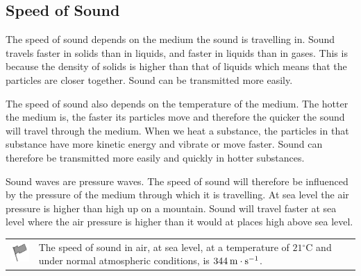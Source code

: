             \subsection{ Speed of Sound}
            \nopagebreak
      \label{m38799*id183885}The speed of sound depends on the medium the sound is travelling in. Sound travels faster in solids than in liquids, and faster in liquids than in gases. This is because the density of solids is higher than that of liquids which means that the particles are closer together. Sound can be transmitted more easily.\par 
      \label{m38799*id183891}The speed of sound also depends on the temperature of the medium. The hotter the medium is, the faster its particles move and therefore the quicker the sound will travel through the medium. When we heat a substance, the particles in that substance have more kinetic energy and vibrate or move faster. Sound can therefore be transmitted more easily and quickly in hotter substances.\par 
      \label{m38799*id183897}Sound waves are pressure waves. The speed of sound will therefore be influenced by the pressure of the medium through which it is travelling. At sea level the air pressure is higher than high up on a mountain. Sound will travel faster at sea level where the air pressure is higher than it would at places high above sea level.\par 
\label{m38799*fhsst!!!underscore!!!id164}\begin{definition}
	  \begin{tabular*}{15 cm}{m{15 mm}m{}}
	\hspace*{-50pt}  \includegraphics[width=0.5in]{col11305.imgs/psflag2.png}   & \Definition{   \label{id2448438}\textbf{ Speed of sound }} { \label{m38799*meaningfhsst!!!underscore!!!id164}
     The speed of sound in air, at sea level, at a temperature of $21{}^{\circ }\mathrm{C}$ and under normal atmospheric conditions, is $344\phantom{\rule{2pt}{0ex}}\mathrm{m}\ensuremath{\cdot}\mathrm{s}{}^{-1}$. 
       } 
      \end{tabular*}
      \end{definition}
\label{m38799*secfhsst!!!underscore!!!id167}

